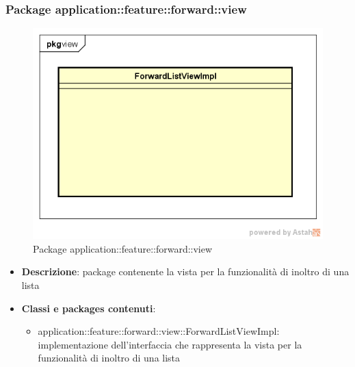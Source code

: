 \subsubsection{Package application::feature::forward::view}
\label{Package application::feature::forward::view}
\begin{figure}[H]
	\centering
	\includegraphics[scale=0.5]{Sezioni/Packages/Application/forward_view.png}
	\caption{Package application::feature::forward::view}
\end{figure}
\begin{itemize}
	\item \textbf{Descrizione}: package contenente la vista per la funzionalità di inoltro di una lista
	\item \textbf{Classi e packages contenuti}:
	\begin{itemize}
	\item application::feature::forward::view::ForwardListViewImpl: implementazione dell'interfaccia che rappresenta la vista per la funzionalità di inoltro di una lista
	\end{itemize}
\end{itemize}

